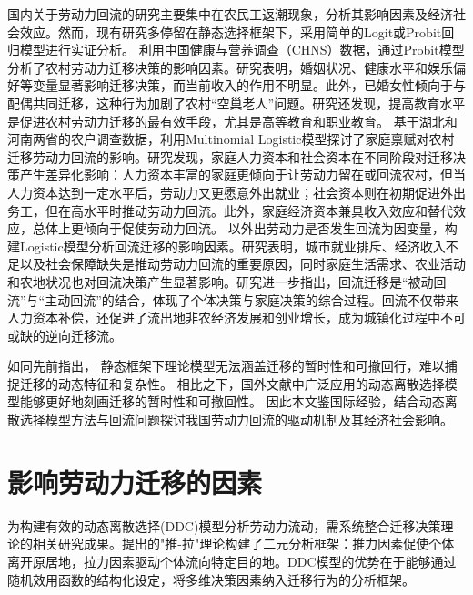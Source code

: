 \documentclass[a4paper, zihao=-4, fontset = mac, oneside]{ctexbook} %
\begin{document}
国内关于劳动力回流的研究主要集中在农民工返潮现象，分析其影响因素及经济社会效应。然而，现有研究多停留在静态选择框架下，采用简单的Logit或Probit回归模型进行实证分析。
\textcite{WangZhiQiangZhongGuoNongCunLaoDongLiQianYiYingXiangYinSuYanJiuJiYuProbitMoXingDeShiZhengFenXi2011}利用中国健康与营养调查（CHNS）数据，通过Probit模型分析了农村劳动力迁移决策的影响因素。研究表明，婚姻状况、健康水平和娱乐偏好等变量显著影响迁移决策，而当前收入的作用不明显。此外，已婚女性倾向于与配偶共同迁移，这种行为加剧了农村“空巢老人”问题。研究还发现，提高教育水平是促进农村劳动力迁移的最有效手段，尤其是高等教育和职业教育。
\textcite{ShiZhiLeiJiaTingBingFuJiaTingJueCeYuNongCunQianYiLaoDongLiHuiLiu2012}基于湖北和河南两省的农户调查数据，利用Multinomial Logistic模型探讨了家庭禀赋对农村迁移劳动力回流的影响。研究发现，家庭人力资本和社会资本在不同阶段对迁移决策产生差异化影响：人力资本丰富的家庭更倾向于让劳动力留在或回流农村，但当人力资本达到一定水平后，劳动力又更愿意外出就业；社会资本则在初期促进外出务工，但在高水平时推动劳动力回流。此外，家庭经济资本兼具收入效应和替代效应，总体上更倾向于促使劳动力回流。
\textcite{RenYuanNongCunWaiChuLaoDongLiHuiLiuQianYiDeYingXiangYinSuHeHuiLiuXiaoYing2017}以外出劳动力是否发生回流为因变量，构建Logistic模型分析回流迁移的影响因素。研究表明，城市就业排斥、经济收入不足以及社会保障缺失是推动劳动力回流的重要原因，同时家庭生活需求、农业活动和农地状况也对回流决策产生显著影响。研究进一步指出，回流迁移是“被动回流”与“主动回流”的结合，体现了个体决策与家庭决策的综合过程。回流不仅带来人力资本补偿，还促进了流出地非农经济发展和创业增长，成为城镇化过程中不可或缺的逆向迁移流。


如同先前指出，
静态框架下理论模型无法涵盖迁移的暂时性和可撤回行，难以捕捉迁移的动态特征和复杂性。
相比之下，国外文献中广泛应用的动态离散选择模型能够更好地刻画迁移的暂时性和可撤回性。
因此本文鉴国际经验，结合动态离散选择模型方法与回流问题探讨我国劳动力回流的驱动机制及其经济社会影响。


\section{影响劳动力迁移的因素}
\label{sec:_影响劳动力迁移的因素}

为构建有效的动态离散选择(DDC)模型分析劳动力流动，需系统整合迁移决策理论的相关研究成果。\textcite{leeTheoryMigration1966}提出的"推-拉"理论构建了二元分析框架：推力因素促使个体离开原居地，拉力因素驱动个体流向特定目的地。DDC模型的优势在于能够通过随机效用函数的结构化设定，将多维决策因素纳入迁移行为的分析框架。
\end{document}
